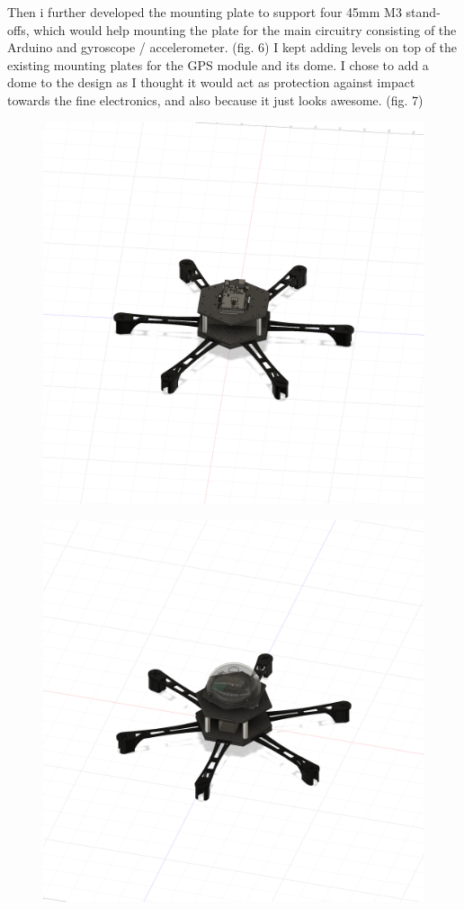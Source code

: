 \documentclass{hitec}
\begin{document}
Then i further developed the mounting plate to support four 45mm M3 stand-offs, which would help mounting the plate for the main circuitry consisting of the Arduino and gyroscope / accelerometer. (fig. 6)\newline
I kept adding levels on top of the existing mounting plates for the GPS module and its dome. I chose to add a dome to the design as I thought it would act as protection against impact towards the fine electronics, and also because it just looks awesome. (fig. 7)
\begin{figure}[h]
	\centering
	\begin{minipage}{.5\textwidth}
		\centering
		\includegraphics[width=.9\linewidth]{emount}
		\label{fig:emount}
	\end{minipage}%
	\begin{minipage}{.5\textwidth}
		\centering
		\includegraphics[width=.9\linewidth]{dome}
		\label{fig:dome}
	\end{minipage}
\end{figure}
\end{document}
